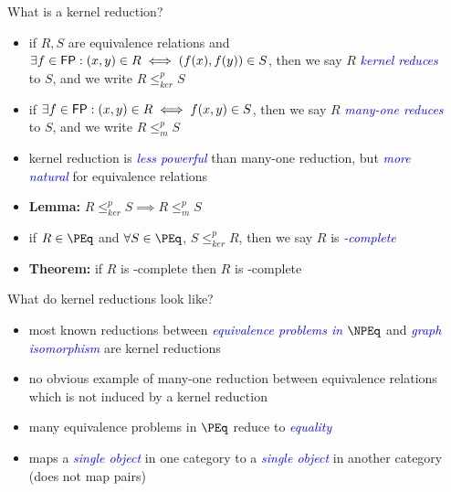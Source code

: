 \documentclass[final]{beamer}
\newcommand{\emphblue}[1]{\emph{\textcolor{blue}{#1}}}
\newcommand{\kr}{\leq_{ker}^p}
\newcommand{\mor}{\leq_{m}^p}
\begin{document}
\begin{frame}{}
\begin{columns}[t]
\begin{column}{.3\linewidth}
    \end{column}

    \begin{column}{.3\linewidth}
      \begin{block}{\LARGE What is a kernel reduction?}
        \begin{itemize}\Large
        \item if $R,S$ are equivalence relations and $\exists f\in{\ensuremath{\mathsf{FP}}}: (x,y)\in
          R\iff(f(x),f(y))\in S$, then we say $R$ \emphblue{kernel reduces} to
          $S$, and we write $R\kr S$
        \item if $\exists f\in{\ensuremath{\mathsf{FP}}}: (x,y)\in R\iff f(x,y)\in S$, then we say $R$
          \emphblue{many-one reduces} to $S$, and we write $R\mor S$
        \item kernel reduction is \emphblue{less powerful} than many-one
          reduction, but \emphblue{more natural} for equivalence relations
        \item \textbf{Lemma:} $R\kr S\implies R\mor S$
        \item if $R\in\PEq$ and $\forall S\in\PEq$, $S\kr R$, then we say $R$
          is \emphblue{\PEq-complete}
        \item \textbf{Theorem:} if $R$ is \NPEq-complete then $R$ is
          \NP-complete
        \end{itemize}
      \end{block}

      \vspace{1.7in}

      \begin{block}{\LARGE What do kernel reductions look like?}
        \begin{itemize}\Large
        \item most known reductions between \emphblue{equivalence problems in
          $\NPEq$} and \emphblue{graph isomorphism} are kernel reductions
        \item no obvious example of many-one reduction between equivalence
          relations which is not induced by a kernel reduction
        \item many equivalence problems in $\PEq$ reduce to \emphblue{equality}
        \item maps a \emphblue{single object} in one category to a
          \emphblue{single object} in another category (does not map pairs)
        \end{itemize}
      \end{block}


\end{column}
\end{columns}
\end{frame}
\end{document}
